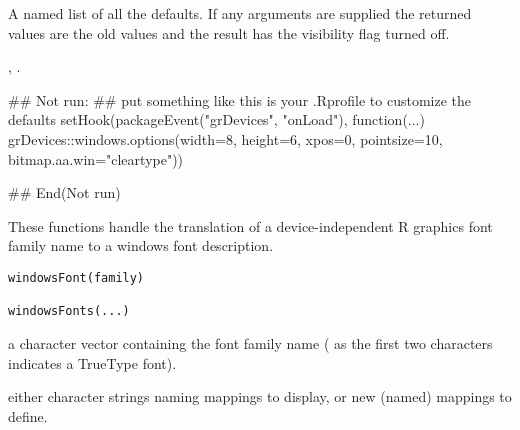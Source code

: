 %
\begin{Value}
A named list of all the defaults.  If any arguments are supplied the
returned values are the old values and the result has the visibility
flag turned off.
\end{Value}
%
\begin{SeeAlso}\relax
{}, .
\end{SeeAlso}
%
\begin{Examples}
\begin{ExampleCode}
## Not run: 
## put something like this is your .Rprofile to customize the defaults
setHook(packageEvent("grDevices", "onLoad"),
        function(...)
            grDevices::windows.options(width=8, height=6,
                                       xpos=0, pointsize=10,
                                       bitmap.aa.win="cleartype"))

## End(Not run)
\end{ExampleCode}
\end{Examples}
%
\begin{Description}\relax
These functions handle the translation of a device-independent R graphics
font family name to a windows font description.
\end{Description}
%
\begin{Usage}
\begin{verbatim}
windowsFont(family)

windowsFonts(...)
\end{verbatim}
\end{Usage}
%
\begin{Arguments}
\begin{ldescription}
\item[\code{family}] a character vector containing the font family name
( as the first two characters indicates a TrueType font).

\item[\code{...}] either character strings naming mappings to display,
or new (named) mappings to define.
\end{ldescription}
\end{Arguments}
%
